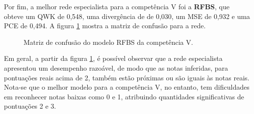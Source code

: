 Por fim, a melhor rede especialista para a competência V foi a \textbf{RFBS}, que obteve um QWK de 0,548, uma divergência de de 0,030, um MSE de 0,932 e uma PCE de 0,494. A figura \ref{fig:eval-c5-confusion-matrix} mostra a matriz de confusão para a rede.

\begin{figure}[H]
    \centering
    \resizebox{0.5\textwidth}{!}{}
    \caption{Matriz de confusão do modelo RFBS da competência V.}
    \label{fig:eval-c5-confusion-matrix}
\end{figure}

Em geral, a partir da figura \ref{fig:eval-c5-confusion-matrix}, é possível observar que a rede especialista apresentou um desempenho razoável, de modo que as notas inferidas, para pontuações reais acima de 2, também estão próximas ou são iguais às notas reais. Nota-se que o melhor modelo para a competência V, no entanto, tem dificuldades em reconhecer notas baixas como 0 e 1, atribuindo quantidades significativas de pontuações 2 e 3.
